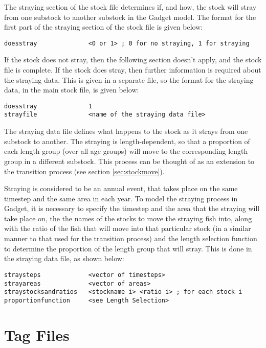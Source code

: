\documentclass[]{book}
\begin{document}
The straying section of the stock file determines if, and how, the stock
will stray from one substock to another substock in the Gadget model.
The format for the first part of the straying section of the stock file
is given below:

\begin{verbatim}
doesstray              <0 or 1> ; 0 for no straying, 1 for straying
\end{verbatim}

If the stock does not stray, then the following section doesn't apply,
and the stock file is complete. If the stock does stray, then further
information is required about the straying data. This is given in a
separate file, so the format for the straying data, in the main stock
file, is given below:

\begin{verbatim}
doesstray              1
strayfile              <name of the straying data file>
\end{verbatim}

The straying data file defines what happens to the stock as it strays
from one substock to another. The straying is length-dependent, so that
a proportion of each length group (over all age groups) will move to the
corresponding length group in a different substock. This process can be
thought of as an extension to the transition process (see
section \ref{sec:stockmove}).

Straying is considered to be an annual event, that takes place on the
same timestep and the same area in each year. To model the straying
process in Gadget, it is necessary to specify the timestep and the area
that the straying will take place on, the the names of the stocks to
move the straying fish into, along with the ratio of the fish that will
move into that particular stock (in a similar manner to that used for
the transition process) and the length selection function to determine
the proportion of the length group that will stray. This is done in the
straying data file, as shown below:

\begin{verbatim}
straysteps             <vector of timesteps>
strayareas             <vector of areas>
straystocksandratios   <stockname i> <ratio i> ; for each stock i
proportionfunction     <see Length Selection>
\end{verbatim}

\hypertarget{chap:tag}{%
\chapter{Tag Files}\label{chap:tag}}
\end{document}
